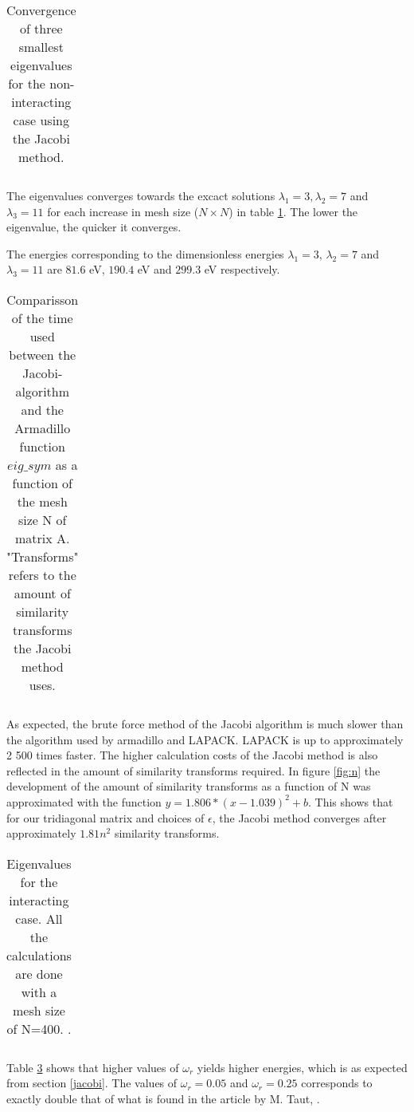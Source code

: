 
\begin{table}[H]\caption{Convergence of three smallest eigenvalues for the non-interacting case using the Jacobi method.}
	\label{tab:eigval}
	\begin{tabular}{cccc}
		
	\end{tabular}
\end{table}

The eigenvalues converges towards the excact solutions  $ \lambda_1=3, \lambda_2 =7  $ and $ \lambda_3 =11 $ for each increase in mesh size  ($ N\times N $) in table \ref{tab:eigval}. The lower the  eigenvalue, the quicker it converges. 

The energies corresponding to the dimensionless energies $\lambda_1 = 3 $, $\lambda_2 = 7 $ and $\lambda_3 = 11$ are $ 81.6 $ eV,  $ 190.4 $ eV and $ 299.3 $ eV respectively. 

\begin{table}[H]\caption{Comparisson of the time used between the Jacobi-algorithm and the Armadillo function  $eig\_sym$ as a function of the mesh size N of matrix A. "Transforms" refers to the amount of similarity transforms the Jacobi method uses.}
	\label{tab:time}
	\begin{tabular}{cccccc}
		
	\end{tabular}
\end{table}


As expected, the brute force method of the Jacobi algorithm is much slower than the algorithm used by armadillo and LAPACK. LAPACK is up to approximately 2 500 times faster. The higher calculation costs of the Jacobi method is also reflected in the amount of similarity transforms required.  In figure \ref{fig:n} the development of the amount of similarity transforms as a function of N was approximated with the function $ y = 1.806*(x-1.039)^2 + b $. This shows that for our tridiagonal matrix and choices of $ \epsilon $, the Jacobi method converges after approximately $1.81n^2 $ similarity transforms. 


\begin{table}[H]\caption{Eigenvalues for the interacting case. All the calculations are done with a mesh size of N=400. . }
	\label{tab:omega}
	\begin{tabular}{cccc}
		
	\end{tabular}
\end{table}

Table \ref{tab:omega} shows that higher values of $ \omega_r$ yields higher energies, which is as expected from section \ref{jacobi}. The values of $ \omega_r= 0.05   $ and $ \omega_r= 0.25   $  corresponds to exactly double that of what is found in the article by M. Taut, \cite{litterature}.  
